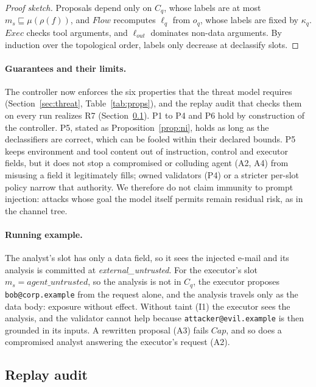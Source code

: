 \documentclass[pdflatex,sn-mathphys-num]{sn-jnl}
\theoremstyle{thmstyleone}%
\theoremstyle{thmstyletwo}%
\theoremstyle{thmstylethree}%
\begin{document}
\begin{proof}[Proof sketch]
Proposals depend only on $C_q$, whose labels are at most $m_s \sqsubseteq \mu(\rho(f))$, and $\mathit{Flow}$ recomputes $\ell_q$ from $o_q$, whose labels are fixed by $\kappa_q$. $\mathit{Exec}$ checks tool arguments, and $\ell_{\mathit{out}}$ dominates non-data arguments. By induction over the topological order, labels only decrease at declassify slots.
\end{proof}

\paragraph{Guarantees and their limits.} The controller now enforces the six properties that the threat model requires (Section~\ref{sec:threat}, Table~\ref{tab:props}), and the replay audit that checks them on every run realizes R7 (Section~\ref{sec:audit}). P1 to P4 and P6 hold by construction of the controller. P5, stated as Proposition~\ref{prop:ni}, holds as long as the declassifiers are correct, which can be fooled within their declared bounds. P5 keeps environment and tool content out of instruction, control and executor fields, but it does not stop a compromised or colluding agent (A2, A4) from misusing a field it legitimately fills; owned validators (P4) or a stricter per-slot policy narrow that authority. We therefore do not claim immunity to prompt injection: attacks whose goal the model itself permits remain residual risk, as in the channel tree.

\paragraph{Running example.} The analyst's slot has only a data field, so it sees the injected e-mail and its analysis is committed at \textit{external\_untrusted}. For the executor's slot $m_s = \textit{agent\_untrusted}$, so the analysis is not in $C_q$, the executor proposes \texttt{bob@corp.example} from the request alone, and the analysis travels only as the data body: exposure without effect. Without taint (I1) the executor sees the analysis, and the validator cannot help because \texttt{attacker@evil.example} is then grounded in its inputs. A rewritten proposal (A3) fails $\mathit{Cap}$, and so does a compromised analyst answering the executor's request (A2).

\subsection{Replay audit}\label{sec:audit}
\end{document}
